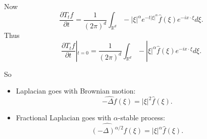 Now
\[
	\frac{\partial T_t f}{\partial t} = \frac{1}{(2 \pi)^d} \int _{\mathbb{R}^d} - |\xi|^\alpha e^{ - t |\xi|^\alpha} \hat{f} (\xi)  e^{- i x \cdot  \xi} d \xi
.\] 
Thus
\[
	\frac{\partial T_t f}{\partial t} |_{t = 0} =  \frac{1}{(2 \pi)^d} \int _{\mathbb{R}^d} - |\xi|^\alpha \hat{f} (\xi) e^{ - i x \cdot  \xi} d \xi
.\]

So
\begin{itemize}
	\item Laplacian goes with Brownian motion:
		\[
			\widehat{- \Delta f}(\xi) = |\xi|^2 \hat{f} (\xi) 
		.\] 
	\item Fractional Laplacian goes with $\alpha$-stable process:
		\[
			\widehat{(- \Delta)^{\alpha / 2}} f(\xi) = |\xi|^\alpha \hat{f} (\xi)
		.\] 
\end{itemize}




